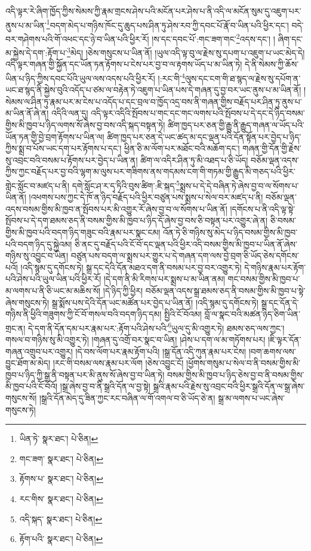 འདི་ལྟར་རེ་ཞིག་ཁྱོད་ཀྱིས་སེམས་ཀྱི་རྣམ་གྲངས་ཤེས་པའི་མངོན་པར་ཤེས་པ་ནི་འདི་ལ་མངོན་སུམ་དུ་འཇུག་པར་ནུས་པ་མ་ཡིན་\footnote{ཡིན་ཏེ་  སྣར་ཐང་།  པེ་ཅིན། }བདག་མེད་པ་གཉིས་ཁོང་དུ་ཆུད་པས་ཤིན་ཏུ་ཤེས་རབ་ཀྱི་དབང་པོ་རྣོ་བ་ཡིན་པའི་ཕྱིར་དང་། བདེ་བར་གཤེགས་པའི་གོ་འཕང་དང་ཉེ་བ་ཡིན་པའི་ཕྱིར་རོ། །ས་དང་དབང་པོ་:གང་ཟག་གང་\footnote{གང་ཟག་  སྣར་ཐང་།  པེ་ཅིན། }འདས་དང་། །
ཞིག་དང་མ་སྐྱེས་དེ་དག་:རྟོག་པ་\footnote{རྟོགས་པ་  སྣར་ཐང་།  པེ་ཅིན། }མེད། །ཅེས་གསུངས་པ་ཡིན་ནོ། །ཡུལ་འདི་ལྟ་བུ་ལ་རྗེས་སུ་དཔག་པ་འཇུག་པ་ཡང་མེད་དེ། འདི་ལྟར་གཞན་གྱི་སྐྱོན་དང་ཡོན་ཏན་རྟོགས་པ་ངེས་པར་བྱ་བ་ལ་རྟགས་ཡོད་པ་མ་ཡིན་ཏེ། དེ་ནི་སེམས་ཀྱི་ཆོས་ཡིན་པ་ཉིད་ཀྱིས་དབང་པོའི་ཡུལ་ལས་འདས་པའི་ཕྱིར་རོ། །:རང་གི་\footnote{རང་གིས་  སྣར་ཐང་།  པེ་ཅིན། }ལུས་དང་ངག་གི་ཐ་སྙད་ལ་རྗེས་སུ་དཔོག་ན་ཡང་ཐ་སྙད་ནི་སྐྱེས་བུའི་འདོད་པ་ཙམ་ལ་བརྟེན་ཏེ་འཇུག་པ་ཡིན་པས་དེ་གཞན་དུ་བྱ་བར་ཡང་ནུས་པ་མ་ཡིན་ནོ། །སེམས་ལ་ཤིན་ཏུ་རྣམ་པར་མ་ངེས་པ་འདོད་པ་དང་བྲལ་བ་ཁྱོད་འདྲ་བས་ནི་གཞན་གྱིས་བརྗོད་པར་ཤིན་ཏུ་ནུས་པ་མ་ཡིན་ནོ་ཞེ་ན། འདིའི་ལན་དུ། འདི་ལྟར་འདིའི་སྤོབས་པ་གང་དང་གང་ལགས་པའི་སྤོབས་པ་དེ་དང་དེ་ཉིད་བསམ་གྱིས་མི་ཁྱབ་པ་ཉིད་ལགས་སོ་ཞེས་བྱ་བས་འདི་སྐད་བསྟན་ཏེ། ཚིག་ཁྱད་པར་ཅན་གྱི་རྒྱུ་ནི་རྒྱུད་གཞན་ལ་ཡོད་པའི་ཡོན་ཏན་གྱི་བྱེ་བྲག་རྟོགས་པ་ཡིན་ལ། ཚིག་ཁྱད་པར་ཅན་དེ་ཡང་ཚད་མ་དང་ལྡན་པའི་དོན་སྟོན་པར་བྱེད་པ་ཉིད་ཀྱིས་སྨྲ་བ་པོས་ཡང་དག་པར་རྟོགས་པ་དང་། ཕྱིན་ཅི་མ་ལོག་པར་མཐོང་བའི་མཆོག་དང་། གཞན་གྱི་དོན་གྱི་རྗེས་སུ་འབྲང་བའི་བསམ་པ་རྟོགས་པར་བྱེད་པ་ཡིན་ན། ཚིག་ལ་འདིར་ཤིན་ཏུ་མི་འཐད་པ་ཅི་ཡོད། བཅོམ་ལྡན་འདས་ཀྱིས་ཀྱང་བརྗོད་པར་བྱ་བའི་ལྷག་མ་ལུས་པར་གཟིགས་ནས་གདམས་ངག་གི་གཏམ་གྱི་རྒྱུད་མི་གཅད་པའི་ཕྱིར་གླེང་སློང་བ་མཛད་པ་ནི། དགེ་སློང་ཤ་ར་དྭ་ཏིའི་བུས་ཚིག་:ཇི་སྐད་\footnote{འདི་སྐད་  སྣར་ཐང་།  པེ་ཅིན། }སྨྲས་པ་དེ་དེ་བཞིན་ཏེ་ཞེས་བྱ་བ་ལ་སོགས་པ་ཡིན་ནོ། །འཕགས་པས་ཀྱང་དེ་ཁོ་ན་ཉིད་བརྗོད་པའི་ཕྱིར་བཙུན་པས་སྨྲས་པ་སེལ་བར་མཛད་པ་ནི། བཅོམ་ལྡན་འདས་བསམ་གྱིས་མི་ཁྱབ་ན་སྤོབས་པར་མི་འགྱུར་རོ་ཞེས་བྱ་བ་ལ་སོགས་པ་ཡིན་ནོ། །དགོངས་པ་ནི་འདི་ལྟ་སྟེ་སྤོབས་པ་དེ་དག་ཐམས་ཅད་ནི་བསམ་གྱིས་མི་ཁྱབ་པ་ཉིད་དོ་ཞེས་བྱ་བས་ཅི་བསྟན་པར་འགྱུར་ཞེ་ན། ཅི་བསམ་གྱིས་མི་ཁྱབ་པའི་བདག་ཉིད་གཟུང་བའི་རྣམ་པར་སྣང་ངམ། འོན་ཏེ་ཅི་གཉིས་སུ་མེད་པ་ཉིད་བསམ་གྱིས་མི་ཁྱབ་པའི་བདག་ཉིད་དུ་སྐྱེའམ། ཅི་ནང་དུ་བརྗོད་པའི་ངོ་བོ་དང་ལྡན་པའི་ཕྱིར་འདི་བསམ་གྱིས་མི་ཁྱབ་པ་ཡིན་ནོ་ཞེས་གཉིས་སུ་འབྱུང་བ་ཡིན། བཙུན་པས་བདག་ལ་སྨྲས་པར་གྱུར་པ་དེ་གཞན་དག་ལས་བྱེ་བྲག་ཅི་ཡོད་ཅེས་དགོངས་པའོ། །འདི་སྙམ་དུ་དགོངས་ཏེ། སྒྲ་དང་དེའི་དོན་མཐའ་དག་ནི་བསམ་པར་བྱ་བར་འགྱུར་ཏེ། དེ་གཉིས་རྣམ་པར་རྟོག་པའི་ཤེས་པའི་ཡུལ་ཡིན་པའི་ཕྱིར་རོ། །དེ་དག་ནི་མི་རིགས་པར་སྨྲས་པ་མ་ཡིན་ནམ། གང་བསམ་གྱིས་མི་ཁྱབ་པ་མ་ལགས་པ་ནི་ཅི་ཡང་མ་མཆིས་སོ། །དེ་ཉིད་ཀྱི་ཕྱིར། བཅོམ་ལྡན་འདས་སྒྲ་ཐམས་ཅད་ནི་བསམ་གྱིས་མི་ཁྱབ་པ་སྟེ་ཞེས་གསུངས་ཏེ། སྒྲ་སྨོས་པས་དེའི་དོན་ཡང་མཚོན་པར་བྱེད་པ་ཡིན་ནོ། །འདི་སྙམ་དུ་དགོངས་ཏེ། སྒྲ་དང་དོན་དེ་གཉིས་ནི་ཕྱིའི་གཟུགས་ཀྱི་ངོ་བོ་གསལ་བའི་བདག་ཉིད་དམ། སྤྱིའི་ངོ་བོའམ། བློ་ལ་སྣང་བའི་མཚན་ཉིད་ཅིག་ཡིན་གྲང་ན། དེ་དག་ནི་དོན་དམ་པར་རྣམ་པར་:རྟོག་པའི་ཤེས་པའི་\footnote{རྟོག་པའི་  སྣར་ཐང་།  པེ་ཅིན། }ཡུལ་དུ་མི་འགྱུར་ཏེ། ཐམས་ཅད་ལས་ཀྱང་། གསལ་བ་གཉིས་སུ་མི་འགྱུར་ཏེ། །གཞན་དུ་འགྲོ་བར་སྣང་བ་ཡིན། །ཤེས་པ་དག་ལ་མ་གཏོགས་པར། །ཇི་ལྟར་དོན་གཞན་འགྲུབ་པར་འགྱུར། །དེ་བས་ལོག་པར་རྣམ་རྟོག་པའི། །སྒྲ་དོན་འདི་ཀུན་རྣམ་པར་ངེས། །བག་ཆགས་ལས་བྱུང་ཐོག་མ་མེད། །རང་གི་བསམ་ལས་རྣམ་པར་ལོག །ཅེས་འབྱུང་ངོ། །ཕྱོགས་གསུམ་པ་སེལ་བ་ནི་བསམ་གྱིས་མི་ཁྱབ་པ་ཉིད་ཀྱི་སྒྲ་ནི་བསྟན་པར་མི་ནུས་སོ་ཞེས་བྱ་བ་ཡིན་ཏེ། བསམ་གྱིས་མི་ཁྱབ་པ་ཉིད་ཅེས་བྱ་བ་ནི་བསམ་གྱིས་མི་ཁྱབ་པའི་ངོ་བོའོ། །སྒྲ་ཞེས་བྱ་བ་ནི་སྒྲའི་དོན་ལ་བྱ་སྟེ། སྒྲའི་རྣམ་པའི་རྗེས་སུ་འབྲང་བའི་ཕྱིར་སྒྲའི་དོན་ལ་སྒྲ་ཞེས་གསུངས་སོ། །སྒྲའི་དོན་མེད་དུ་ཟིན་ཀྱང་རང་བཞིན་ལ་གོ་འགལ་བ་ཅི་ཡོད་ཅེ་ན། སྒྲ་མ་ལགས་པ་ཡང་ཞེས་གསུངས་ཏེ། 